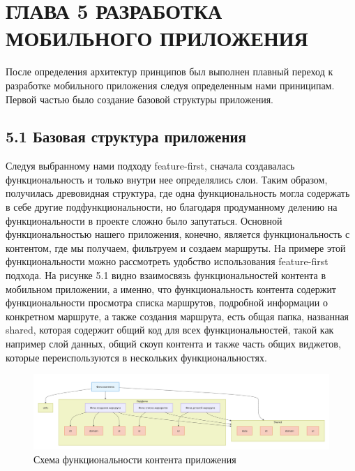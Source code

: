 \section{ГЛАВА 5 РАЗРАБОТКА МОБИЛЬНОГО ПРИЛОЖЕНИЯ}

После определения архитектур принципов был выполнен плавный переход к разработке мобильного приложения следуя определенным нами приниципам. 
Первой частью было создание базовой структуры приложения.

\subsection*{5.1 Базовая структура приложения}
Следуя выбранному нами подходу feature-first, сначала создавалась функциональность и только внутри нее определялись слои. Таким образом, получилась древовидная структура, где одна функциональность могла содержать в себе другие подфункциональности, но благодаря продуманному делению на функциональности в проекте сложно было запутаться. Основной функциональностью нашего приложения, конечно, является функциональность с контентом, где мы получаем, фильтруем и создаем маршруты. На примере этой функциональности можно рассмотреть удобство использования feature-first подхода. На рисунке 5.1 видно взаимосвязь функциональностей контента в мобильном приложении, а именно, что функциональность контента содержит функциональности просмотра списка маршрутов, подробной информации о конкретном маршруте, а также создания маршрута, есть общая папка, названная shared, которая содержит общий код для всех функциональностей, такой как например слой данных, общий скоуп контента и также часть общих виджетов, которые переиспользуются в нескольких функциональностях.

\begin{landscape}
\begin{figure}[H]
\centering
\includegraphics[height=0.4\textwidth]{Images/mobile_logic/структура_фичи.png}
\caption{Схема функциональности контента приложения}
\label{fig:feature_structure}
\end{figure}
\end{landscape}


